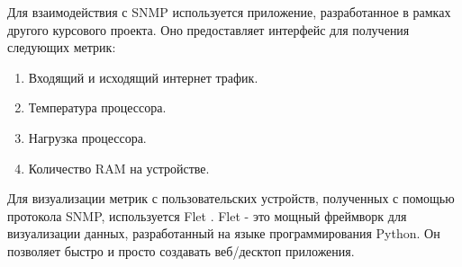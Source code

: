 Для взаимодействия с SNMP используется приложение, разработанное в рамках другого курсового проекта. Оно предоставляет
интерфейс для получения следующих метрик:
\begin{enumerate}
    \item Входящий и исходящий интернет трафик.
    \item Температура процессора.
    \item Нагрузка процессора.
    \item Количество RAM на устройстве.
\end{enumerate}

Для визуализации метрик с пользовательских устройств, полученных с помощью протокола SNMP, используется Flet \cite{fletIntroductionFlet}.
Flet - это мощный фреймворк для визуализации данных, разработанный на языке программирования Python.
Он позволяет быстро и просто создавать веб/десктоп приложения.